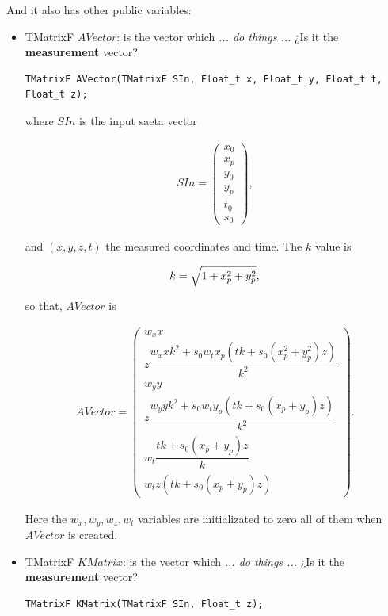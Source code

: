 \documentclass[a4paper]{book}
\begin{document}
And it also has other public variables:

\begin{itemize}
	\item TMatrixF $AVector$: is the vector which \textit{... do things ...} ¿Is it the \textbf{measurement} vector?
	\begin{lstlisting}[style=customc]
TMatrixF AVector(TMatrixF SIn, Float_t x, Float_t y, Float_t t, Float_t z);
	\end{lstlisting}

	where $SIn$ is the input saeta vector

	\begin{align*}
	SIn = \left(
	\begin{array}{c}
	x_0\\
	x_p\\
	y_0\\
	y_p\\
	t_0\\
	s_0
	\end{array} \right),
	\end{align*}
	
	and $(x, y, z, t)$ the measured coordinates and time. The $k$ value is 
	
	\begin{equation}
	\notag
	k = \sqrt{1 + x_p^2 + y_p^2},
	\end{equation}
	
	so that, $AVector$ is
	
	\begin{align*}
	AVector = \left(
	\begin{array}{c}
	w_x x\\
	z \dfrac{w_x x k^2 + s_0 w_t x_p (t k + s_0 (x_p^2 + y_p^2) z)}{k^2}\\
	w_y y\\
	z \dfrac{w_y y k^2 + s_0 w_t y_p (t k + s_0 (x_p + y_p) z)}{k^2}\\
	w_t \dfrac{t k + s_0 (x_p + y_p) z}{k}\\
	w_t z (t k + s_0 (x_p + y_p) z)
	\end{array} \right).
	\end{align*}
	
	Here the $w_x, w_y, w_z, w_t$ variables are initializated to zero all of them when $AVector$ is created.
	
	\item TMatrixF $KMatrix$: is the vector which \textit{... do things ...} ¿Is it the \textbf{measurement} vector?
	\begin{lstlisting}[style=customc]
TMatrixF KMatrix(TMatrixF SIn, Float_t z);
	\end{lstlisting}


\end{itemize}
\end{document}
